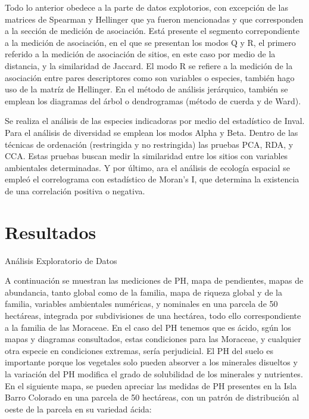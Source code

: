\documentclass[11pt,]{article}
\begin{document}
Todo lo anterior obedece a la parte de datos explotorios, con excepción
de las matrices de Spearman y Hellinger que ya fueron mencionadas y que
corresponden a la sección de medición de asociación. Está presente el
segmento correpondiente a la medición de asociación, en el que se
presentan los modos Q y R, el primero referido a la medición de
asociación de sitios, en este caso por medio de la distancia, y la
similaridad de Jaccard. El modo R se refiere a la medición de la
asociación entre pares descriptores como son variables o especies,
también hago uso de la matríz de Hellinger. En el método de análisis
jerárquico, también se emplean los diagramas del árbol o dendrogramas
(método de cuerda y de Ward).

Se realiza el análisis de las especies indicadoras por medio del
estadístico de Inval. Para el análisis de diversidad se emplean los
modos Alpha y Beta. Dentro de las técnicas de ordenación (restringida y
no restringida) las pruebas PCA, RDA, y CCA. Estas pruebas buscan medir
la similaridad entre los sitios con variables ambientales determinadas.
Y por último, ara el análisis de ecología espacial se empleó el
correlograma con estadístico de Moran's I, que determina la existencia
de una correlación positiva o negativa.

\section{Resultados}\label{resultados}

Análisis Exploratorio de Datos

A continuación se muestran las mediciones de PH, mapa de pendientes,
mapas de abundancia, tanto global como de la familia, mapa de riqueza
global y de la familia, variables ambientales numéricas, y nominales en
una parcela de 50 hectáreas, integrada por subdivisiones de una
hectárea, todo ello correspondiente a la familia de las Moraceae. En el
caso del PH tenemos que es ácido, sgún los mapas y diagramas
consultados, estas condiciones para las Moraceae, y cualquier otra
especie en condiciones extremas, sería perjudicial. El PH del suelo es
importante porque los vegetales solo pueden absorver a los minerales
disueltos y la variación del PH modifica el grado de solubilidad de los
minerales y nutrientes. En el siguiente mapa, se pueden apreciar las
medidas de PH presentes en la Isla Barro Colorado en una parcela de 50
hectáreas, con un patrón de distribución al oeste de la parcela en su
variedad ácida:
\end{document}

